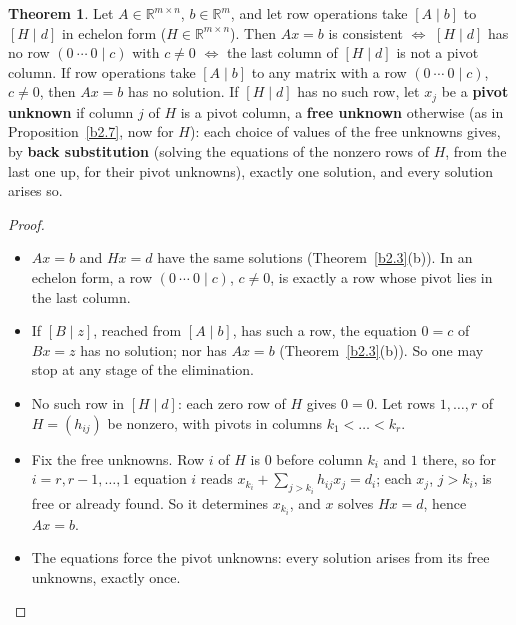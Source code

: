 \documentclass[12pt]{article}
\newcommand{\R}{\mathbb R}
\theoremstyle{definition}
\newtheorem{theorem}{Theorem}
\begin{document}
\begin{theorem}\label{b2.26}
Let \(A\in\R^{m\times n}\), \(b\in\R^m\), and let row operations take \([A\mid b]\) to \([H\mid d]\) in echelon form
(\(H\in\R^{m\times n}\)). Then \(Ax=b\) is consistent \(\iff\) \([H\mid d]\) has no row \((0\ \cdots\ 0\mid c)\) with
\(c\ne0\) \(\iff\) the last column of \([H\mid d]\) is not a pivot column. If row operations take \([A\mid b]\) to any
matrix with a row \((0\ \cdots\ 0\mid c)\), \(c\ne0\), then \(Ax=b\) has no solution. If \([H\mid d]\) has no such row,
let \(x_j\) be a \textbf{pivot unknown} if column \(j\) of \(H\) is a pivot column, a \textbf{free unknown} otherwise
(as in Proposition~\ref{b2.7}, now for \(H\)):
each choice of values of the free unknowns gives, by \textbf{back substitution} (solving the equations of the nonzero
rows of \(H\), from the last one up, for their pivot unknowns), exactly one solution, and every solution arises so.
\end{theorem}
\begin{proof}
\begin{itemize}
\item \(Ax=b\) and \(Hx=d\) have the same solutions (Theorem~\ref{b2.3}(b)). In an echelon form, a row
\((0\ \cdots\ 0\mid c)\), \(c\ne0\), is exactly a row whose pivot lies in the last column.
\item If \([B\mid z]\), reached from \([A\mid b]\), has such a row, the equation \(0=c\) of \(Bx=z\) has no solution;
nor has \(Ax=b\) (Theorem~\ref{b2.3}(b)). So one may stop at any stage of the elimination.
\item No such row in \([H\mid d]\): each zero row of \(H\) gives \(0=0\). Let rows \(1,\dots,r\) of \(H=(h_{ij})\) be
nonzero, with pivots in columns \(k_1<\dots<k_r\).
\item Fix the free unknowns. Row \(i\) of \(H\) is \(0\) before column \(k_i\) and \(1\) there, so for
\(i=r,r-1,\dots,1\) equation \(i\) reads \(x_{k_i}+\sum_{j>k_i}h_{ij}x_j=d_i\); each \(x_j\), \(j>k_i\), is free or
already found. So it determines \(x_{k_i}\), and \(x\) solves \(Hx=d\), hence \(Ax=b\).
\item The equations force the pivot unknowns: every solution arises from its free unknowns, exactly once.\qedhere
\end{itemize}
\end{proof}
\end{document}
